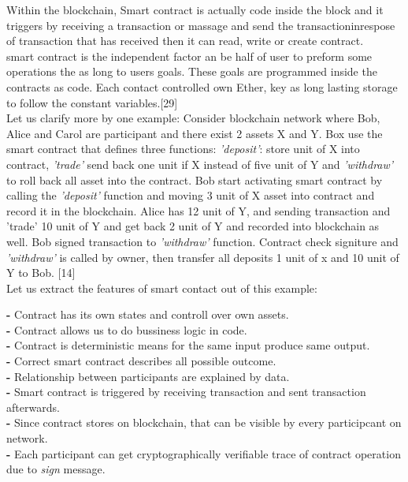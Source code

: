 Within the blockchain, Smart contract is actually code inside the block and it triggers by receiving a transaction or massage and send the transactioninrespose of transaction that has received then it can read, write or create contract. \\
smart contract is the independent factor an be half of user to preform some operations the as long to users goals. These goals are programmed inside the contracts as code. Each contact controlled own Ether, key as long lasting storage to follow the constant variables.[29]\\
Let us clarify more by one example:
Consider blockchain network  where Bob, Alice and Carol are participant and there exist 2 assets X and Y. Box use the smart contract that defines three functions: \textit{'deposit'}: store unit of X into contract, \textit{'trade'} send back one unit if X instead of  five unit of Y  and \textit{'withdraw'} to roll back all asset into the contract.
Bob start activating smart contract by calling the \textit{'deposit'} function and moving 3 unit of X asset into contract and record it in the blockchain. Alice has 12 unit of Y, and sending transaction and 'trade' 10 unit of Y and get back 2 unit of Y and recorded into blockchain as well. Bob signed transaction to \textit{'withdraw'} function. Contract check signiture and \textit{'withdraw'} is called by owner, then transfer all deposits 1 unit of x and 10 unit of Y to Bob. [14]\\
Let us extract the features of smart contact out of this example:

 \textbf{-} Contract has its own states and controll over own assets.\\
 \textbf{-} Contract allows us to do bussiness logic in code. \\
 \textbf{-} Contract is deterministic means for the same input produce same output.\\
 \textbf{-} Correct smart contract describes all possible outcome.\\
 \textbf{-} Relationship between participants are explained by data.\\
 \textbf{-} Smart contract is triggered by receiving transaction and sent transaction afterwards.\\
 \textbf{-} Since contract stores on blockchain, that can be visible by every participcant on network.\\
 \textbf{-} Each participant can get cryptographically verifiable trace of contract operation due to \textit{sign} message.\\

